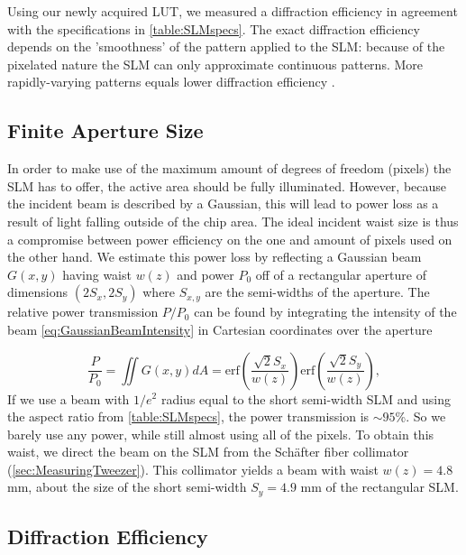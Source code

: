 Using our newly acquired LUT, we measured a diffraction efficiency in agreement with the specifications in \cref{table:SLMspecs}. 
The exact diffraction efficiency depends on the 'smoothness' of the pattern applied to the SLM: because of the pixelated nature the SLM can only approximate continuous patterns. 
More rapidly-varying patterns equals lower diffraction efficiency \cite{Labuhn2016}.

\subsection{Finite Aperture Size}\label{subsec:ApertureSize}

In order to make use of the maximum amount of degrees of freedom (pixels) the SLM has to offer, the active area should be fully illuminated.
However, because the incident beam is described by a Gaussian, this will lead to power loss as a result of light falling outside of the chip area.
The ideal incident waist size is thus a compromise between power efficiency on the one and amount of pixels used on the other hand.
We estimate this power loss by reflecting a Gaussian beam $G(x,y)$ having waist $w(z)$ and power $P_0$ off of a rectangular aperture of dimensions $(2S_x, 2S_y)$ where $S_{x,y}$ are the semi-widths of the aperture. 
The relative power transmission $P/P_0$ can be found by integrating the intensity of the beam \cref{eq:GaussianBeamIntensity} in Cartesian coordinates over the aperture

\begin{equation}\label{eq:RectAperturePower}
	\frac{P}{P_0} =
	\iint G(x,y) dA=
	\text{erf}\left(\frac{\sqrt{2}S_x}{w(z)}\right) \text{erf}\left(\frac{\sqrt{2}S_y}{w(z)}\right),
\end{equation}
If we use a beam with $1/e^2$ radius equal to the short semi-width SLM and using the aspect ratio from \cref{table:SLMspecs}, the power transmission is $\sim 95$\%.
So we barely use any power, while still almost using all of the pixels.
To obtain this waist, we direct the beam on the SLM from the Schäfter fiber collimator (\cref{sec:MeasuringTweezer}).
This collimator yields a beam with waist $w(z) = 4.8$ mm, about the size of the short semi-width $S_y = 4.9$ mm of the rectangular SLM.


\subsection{Diffraction Efficiency}\label{subsec:Diffraction}

